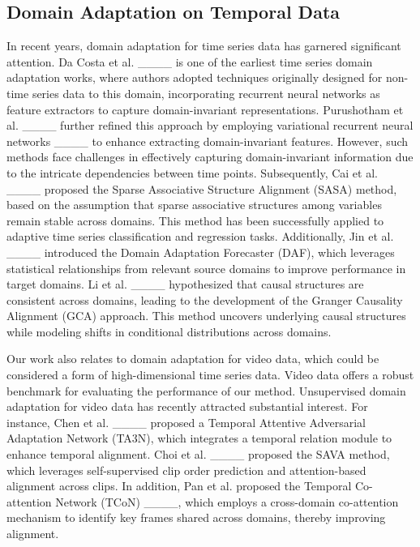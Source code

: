 \subsection{Domain Adaptation on Temporal Data}
In recent years, domain adaptation for time series data has garnered significant attention. Da Costa et al. ____ is one of the earliest time series domain adaptation works, where authors adopted techniques originally designed for non-time series data to this domain, incorporating recurrent neural networks as feature extractors to capture domain-invariant representations. Purushotham et al. ____ further refined this approach by employing variational recurrent neural networks ____ to enhance extracting domain-invariant features. However, such methods face challenges in effectively capturing domain-invariant information due to the intricate dependencies between time points.
Subsequently, Cai et al. ____ proposed the Sparse Associative Structure Alignment (SASA) method, based on the assumption that sparse associative structures among variables remain stable across domains. This method has been successfully applied to adaptive time series classification and regression tasks. Additionally, Jin et al. ____ introduced the Domain Adaptation Forecaster (DAF), which leverages statistical relationships from relevant source domains to improve performance in target domains. Li et al. ____ hypothesized that causal structures are consistent across domains, leading to the development of the Granger Causality Alignment (GCA) approach. This method uncovers underlying causal structures while modeling shifts in conditional distributions across domains.

Our work also relates to domain adaptation for video data, which could be considered a form of high-dimensional time series data. Video data offers a robust benchmark for evaluating the performance of our method. Unsupervised domain adaptation for video data has recently attracted substantial interest. For instance, Chen et al. ____ proposed a Temporal Attentive Adversarial Adaptation Network (TA3N), which integrates a temporal relation module to enhance temporal alignment. Choi et al. ____ proposed the SAVA method, which leverages self-supervised clip order prediction and attention-based alignment across clips. In addition, Pan et al. proposed the Temporal Co-attention Network (TCoN) ____, which employs a cross-domain co-attention mechanism to identify key frames shared across domains, thereby improving alignment. 

